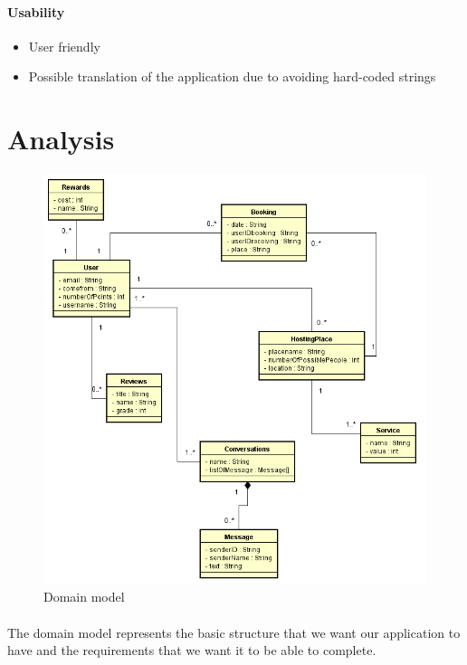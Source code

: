 \documentclass[paper=a4, fontsize=12pt,DIV=14]{scrartcl}    %
\begin{document}
        			\paragraph{Usability}
        			\begin{itemize}
        				\item User friendly
        				\item Possible translation of the application due to avoiding hard-coded strings
        			\end{itemize}

    \newpage
        \section{Analysis}
            \begin{figure}[!htbp]
                \center
                \includegraphics[scale=0.9]{img/domain_model.png}
                \caption{Domain model}
            \end{figure}
            \paragraph{}The domain model represents the basic structure that we want our application to have and the requirements that we want it to be able to complete.
\end{document}
